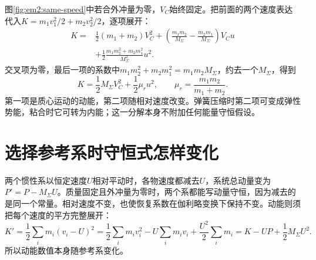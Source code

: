 图\ref{fig:em2:same-speed}中若合外冲量为零，$V_C$始终固定。把前面的两个速度表达代入$K=m_1v_1^2/2+m_2v_2^2/2$，逐项展开：
\begin{align*}
K={}&\frac12(m_1+m_2)V_C^2
+\left(\frac{m_1m_2}{M_\Sigma}-\frac{m_2m_1}{M_\Sigma}\right)V_Cu\\
&+\frac12\frac{m_1m_2^2+m_2m_1^2}{M_\Sigma^2}u^2.
\end{align*}
交叉项为零，最后一项的系数中$m_1m_2^2+m_2m_1^2=m_1m_2M_\Sigma$，约去一个$M_\Sigma$，得到
\[
K=\frac12M_\Sigma V_C^2+\frac12\mu_r u^2,
\qquad \mu_r=\frac{m_1m_2}{m_1+m_2}.
\]
第一项是质心运动的动能，第二项随相对速度改变。弹簧压缩时第二项可变成弹性势能，粘合时它可转为内能；这一分解本身不附加任何能量守恒假设。


\section{选择参考系时守恒式怎样变化}

两个惯性系以恒定速度$U$相对平动时，各物速度都减去$U$，系统总动量变为$P'=P-M_{\Sigma}U$。质量固定且外冲量为零时，两个系都能写动量守恒，因为减去的是同一个常量。相对速度不变，也使恢复系数在伽利略变换下保持不变。动能则须把每个速度的平方完整展开：
\[
K'=\frac12\sum_i m_i(v_i-U)^2
=\frac12\sum_i m_iv_i^2-U\sum_i m_iv_i+\frac{U^2}{2}\sum_i m_i
=K-UP+\frac12M_\Sigma U^2.
\]
所以动能数值本身随参考系变化。

